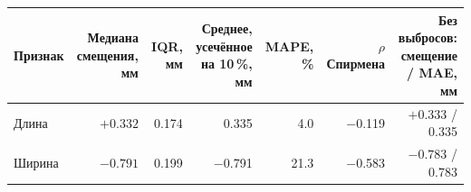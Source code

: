 \begin{tabular}{@{}lrrrrrr@{}}
\toprule
Признак & \shortstack{Медиана\\смещения, мм} & IQR, мм &
\shortstack{Среднее, усечённое\\на 10\,\%, мм} & MAPE, \% &
\shortstack{$\rho$\\Спирмена} &
\shortstack{Без выбросов:\\смещение / MAE, мм} \\
\midrule
Длина & $+\num{0.332}$ & \num{0.174} & \num{0.335} & \num{4.0} & \num{-0.119} & $+\num{0.333}$ / \num{0.335} \\
Ширина & $-\num{0.791}$ & \num{0.199} & \num{-0.791} & \num{21.3} & \num{-0.583} & $-\num{0.783}$ / \num{0.783} \\
\bottomrule
\end{tabular}
